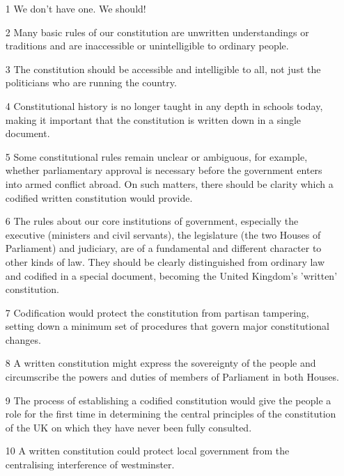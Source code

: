 \documentclass[14pt,titlepage]{extarticle}
\begin{document}
\begin{itemize}
  
\item[1]
  We don't have one. We should!

\item[2]
  Many basic rules of our constitution are unwritten understandings or traditions and are inaccessible or unintelligible to ordinary people.

\item[3]
  The constitution should be accessible and intelligible to all, not just the politicians who
are running the country.

\item[4]
  Constitutional history is no longer taught in any depth in schools today, making it important that the constitution is written down in a single document.

\item[5]
  Some constitutional rules remain unclear or ambiguous, for example, whether parliamentary approval is necessary before the government enters into armed conflict abroad.
On such matters, there should be clarity which a codified written constitution would provide.

\item[6]
  The rules about our core institutions of government, especially the
executive (ministers and civil servants), the legislature (the two Houses of
Parliament) and judiciary, are of a fundamental and different character to other
kinds of law. They should be clearly distinguished from ordinary law and codified
in a special document, becoming the United Kingdom's 'written' constitution.

\item[7]
  Codification would protect the constitution from partisan tampering, setting down a minimum set of procedures that govern major constitutional changes.

\item[8]
  A written constitution might express the sovereignty of the people
and circumscribe the powers and duties of members of Parliament in both
Houses.

\item[9]
  The process of establishing a codified constitution would give the people a
role for the first time in determining the central principles of the constitution of
the UK on which they have never been fully consulted.

\item[10]
  A written constitution could protect local government from the centralising interference of westminster.


\end{itemize}
\end{document}
